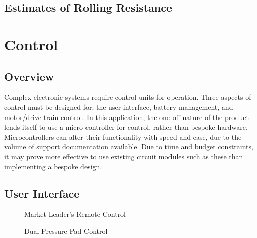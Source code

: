 \documentclass[journal,10pt]{IEEEtran}
\begin{document}
    \subsection{Estimates of Rolling Resistance}
    \begin{figure}[H]
        \centering
        \label{fig:WheelEquations}
    \end{figure}
    \cite{Combined_Resistance} 
    
\section{Control}
    \subsection{Overview}
    	Complex electronic systems require control units for operation.
    	Three aspects of control must be designed for; the user interface, battery management, and motor/drive train control.
    	In this application, the one-off nature of the product lends itself to use a micro-controller for control, rather than bespoke hardware. Microcontrollers can alter their functionality with speed and ease, due to the volume of support documentation available. Due to time and budget constraints, it may prove more effective to use existing circuit modules such as these than implementing a bespoke design.
    \subsection{User Interface}
        \begin{figure}[H]
            \centering
            \caption{Market Leader's Remote Control}
            \label{fig:Boosted Remote}
        \end{figure}
        \begin{figure}[H]
            \centering
            \caption{Dual Pressure Pad Control}
            \label{fig:Pressure Pads}
        \end{figure}
            
\end{document}
